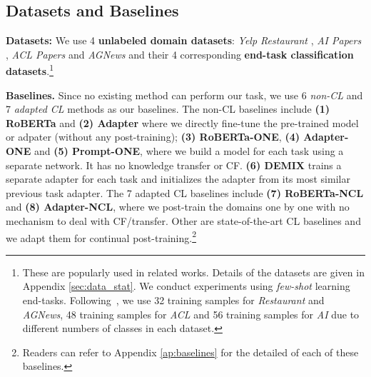 \documentclass[11pt]{article}
\begin{document}
\subsection{Datasets and Baselines}
\label{sec.data-baselines}
\textbf{Datasets:} We use 4 \textbf{unlabeled domain datasets}: \textit{Yelp Restaurant} \cite{DBLP:conf/naacl/XuLSY19}, \textit{AI Papers} \cite{DBLP:conf/acl/LoWNKW20}, \textit{ACL Papers} \cite{DBLP:conf/acl/LoWNKW20} and \textit{AGNews} \cite{DBLP:conf/nips/ZhangZL15} and their 4 corresponding \textbf{end-task classification datasets}.\footnote{These are popularly used in related works. Details of the datasets are given in {Appendix} \ref{sec:data_stat}.
We conduct experiments using \textit{few-shot} learning end-tasks. Following~\cite{gu2021ppt}, we use 32 training samples for \textit{Restaurant} and \textit{AGNews}, 48 training samples for \textit{ACL} and 56 training samples for \textit{AI} due to different numbers of classes in each dataset.}







\vspace{+1.5mm}
\noindent
\textbf{Baselines.} Since no existing method can perform our task, we use 6 \textit{non-CL} and 7 \textit{adapted CL} methods as our baselines. The non-CL baselines include \textbf{(1) RoBERTa} and \textbf{(2) Adapter} where we directly fine-tune the pre-trained model or adpater (without any post-training); \textbf{(3) RoBERTa-ONE}, \textbf{(4) Adapter-ONE} and \textbf{(5) Prompt-ONE}, where we build a model for each task using a separate network. It has no knowledge transfer or CF. \textbf{(6) DEMIX} \cite{gururangan2021demix} trains a separate adapter for each task and initializes the adapter from its most similar previous task adapter. The 7 adapted CL baselines include \textbf{(7) RoBERTa-NCL} and \textbf{(8) Adapter-NCL}, where we post-train the domains one by one with no mechanism to deal with CF/transfer. Other are state-of-the-art CL baselines and we adapt them for continual post-training.\footnote{Readers can refer to Appendix \ref{ap:baselines} for the detailed of each of these baselines.}
\end{document}
